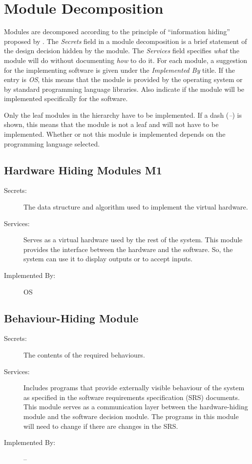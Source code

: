 \documentclass[12pt, titlepage]{article}
\begin{document}
\section{Module Decomposition} \label{SecMD}

Modules are decomposed according to the principle of ``information hiding''
proposed by \citet{ParnasEtAl1984}. The \emph{Secrets} field in a module
decomposition is a brief statement of the design decision hidden by the
module. The \emph{Services} field specifies \emph{what} the module will do
without documenting \emph{how} to do it. For each module, a suggestion for the
implementing software is given under the \emph{Implemented By} title. If the
entry is \emph{OS}, this means that the module is provided by the operating
system or by standard programming language libraries.  Also indicate if the
module will be implemented specifically for the software.

Only the leaf modules in the
hierarchy have to be implemented. If a dash (\emph{--}) is shown, this means
that the module is not a leaf and will not have to be implemented. Whether or
not this module is implemented depends on the programming language
selected.

\subsection{Hardware Hiding Modules M1}

\begin{description}
\item[Secrets:]The data structure and algorithm used to implement the virtual
  hardware.
\item[Services:]Serves as a virtual hardware used by the rest of the
  system. This module provides the interface between the hardware and the
  software. So, the system can use it to display outputs or to accept inputs.
\item[Implemented By:] OS
\end{description}

\subsection{Behaviour-Hiding Module}

\begin{description}
\item[Secrets:]The contents of the required behaviours.
\item[Services:]Includes programs that provide externally visible behaviour of
  the system as specified in the software requirements specification (SRS)
  documents. This module serves as a communication layer between the
  hardware-hiding module and the software decision module. The programs in this
  module will need to change if there are changes in the SRS.
\item[Implemented By:] --
\end{description}
\end{document}

